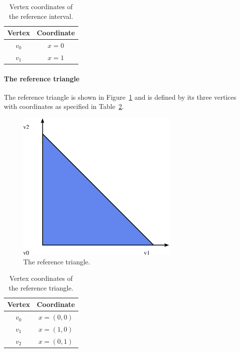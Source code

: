 \begin{table}
\linespread{1.2}\selectfont
  \begin{center}
    \begin{tabular}{|c|c|}
      \hline
      Vertex & Coordinate \\
      \hline
      \hline
      $v_0$ & $x = 0$ \\
      \hline
      $v_1$ & $x = 1$ \\
      \hline
    \end{tabular}
    \caption{Vertex coordinates of the reference interval.}
    \label{tab:interval,vertices}
  \end{center}
\end{table}

\paragraph{The reference triangle}

The reference triangle is shown in Figure~\ref{fig:triangle} and is
defined by its three vertices with coordinates as specified in
Table~\ref{tab:triangle,vertices}.

\begin{figure}
  \begin{center}
    \includegraphics[width=8cm]{chapters/alnes-2/pdf/triangle.pdf}
    \caption{The reference triangle.}
    \label{fig:triangle}
  \end{center}
\end{figure}

\begin{table}
\linespread{1.2}\selectfont
  \begin{center}
    \begin{tabular}{|c|c|}
      \hline
      Vertex & Coordinate \\
      \hline
      \hline
      $v_0$ & $x = (0, 0)$ \\
      \hline
      $v_1$ & $x = (1, 0)$ \\
      \hline
      $v_2$ & $x = (0, 1)$ \\
      \hline
    \end{tabular}
    \caption{Vertex coordinates of the reference triangle.}
    \label{tab:triangle,vertices}
  \end{center}
\end{table}

